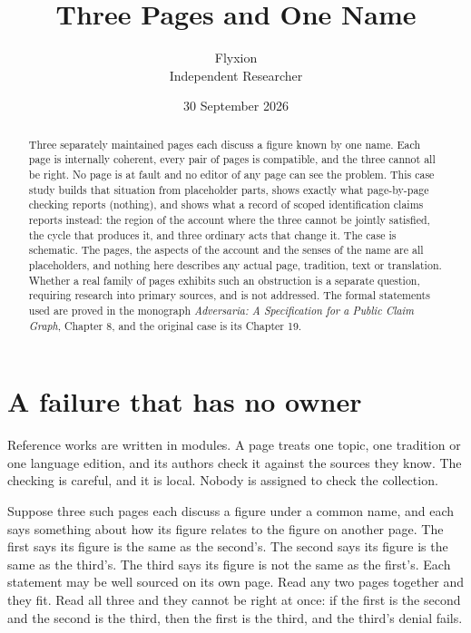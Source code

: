 \documentclass[11pt]{article}
\title{Three Pages and One Name}
\author{Flyxion\\\small Independent Researcher}
\date{30 September 2026}
\begin{document}
\maketitle

\begin{abstract}
\noindent
Three separately maintained pages each discuss a figure known by one name. Each page is internally coherent, every pair of pages is compatible, and the three cannot all be right. No page is at fault and no editor of any page can see the problem. This case study builds that situation from placeholder parts, shows exactly what page-by-page checking reports (nothing), and shows what a record of scoped identification claims reports instead: the region of the account where the three cannot be jointly satisfied, the cycle that produces it, and three ordinary acts that change it. The case is schematic. The pages, the aspects of the account and the senses of the name are all placeholders, and nothing here describes any actual page, tradition, text or translation. Whether a real family of pages exhibits such an obstruction is a separate question, requiring research into primary sources, and is not addressed. The formal statements used are proved in the monograph \emph{Adversaria: A Specification for a Public Claim Graph}, Chapter 8, and the original case is its Chapter 19.
\end{abstract}

\section{A failure that has no owner}

Reference works are written in modules. A page treats one topic, one tradition or one language edition, and its authors check it against the sources they know. The checking is careful, and it is local. Nobody is assigned to check the collection.

Suppose three such pages each discuss a figure under a common name, and each says something about how its figure relates to the figure on another page. The first says its figure is the same as the second's. The second says its figure is the same as the third's. The third says its figure is not the same as the first's. Each statement may be well sourced on its own page. Read any two pages together and they fit. Read all three and they cannot be right at once: if the first is the second and the second is the third, then the first is the third, and the third's denial fails.
\end{document}
